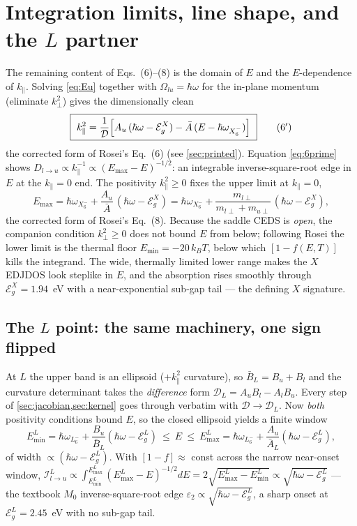 \documentclass[11pt]{article}
\newcommand{\kperp}{k_{\perp}}
\newcommand{\kpar}{k_{\parallel}}
\newcommand{\hw}{\hbar\omega}
\newcommand{\EgX}{\mathcal{E}_{g}^{X}}
\newcommand{\EgL}{\mathcal{E}_{g}^{L}}
\newcommand{\Dc}{\mathcal{D}}
\newcommand{\Dlu}{D_{l\to u}}
\newcommand{\Ic}{\mathcal{I}_{l\to u}}
\newcommand{\Ab}{\bar{A}}
\newcommand{\Bb}{\bar{B}}
\newcommand{\wXsix}{\hbar\omega_{X_6^-}}
\newcommand{\Rq}[1]{\textcolor{roseicol}{\textnormal{(#1)}}}
\begin{document}
\section{Integration limits, line shape, and the $L$ partner}
\label{sec:limits}

The remaining content of Eqs.~\Rq{6}--\Rq{8} is the domain of $E$ and the
$E$-dependence of $\kpar$. Solving \eqref{eq:Eu} together with $\Omega_{lu}=\hw$ for the
in-plane momentum (eliminate $\kperp^2$) gives the dimensionally clean
%
\begin{equation}
\boxed{\ \kpar^{2}=\frac{1}{\Dc}\Bigl[A_u\,(\hw-\EgX)-\Ab\,(E-\wXsix)\Bigr]\ }
\tag{6$'$}
\label{eq:6prime}
\end{equation}
%
the corrected form of Rosei's Eq.~\Rq{6} (see \cref{sec:printed}). Equation
\eqref{eq:6prime} shows $\Dlu\propto\kpar^{-1}\propto(E_{\max}-E)^{-1/2}$: an integrable
inverse-square-root edge in $E$ at the $\kpar=0$ end. The positivity $\kpar^2\ge0$ fixes
the upper limit at $\kpar=0$,
%
\begin{equation}
E_{\max}=\wXsix+\frac{A_u}{\Ab}\,(\hw-\EgX)
       =\wXsix+\frac{m_{l\perp}}{m_{l\perp}+m_{u\perp}}\,(\hw-\EgX),
\label{eq:Emax}
\end{equation}
%
the corrected form of Rosei's Eq.~\Rq{8}. Because the saddle CEDS is \emph{open}, the
companion condition $\kperp^2\ge0$ does not bound $E$ from below; following Rosei the
lower limit is the thermal floor $E_{\min}=-20\,k_BT$, below which $[1-f(E,T)]$ kills the
integrand. The wide, thermally limited lower range makes the $X$ EDJDOS look steplike in
$E$, and the absorption rises smoothly through $\EgX=1.94$~eV with a near-exponential
sub-gap tail --- the defining $X$ signature.

\subsection{The $L$ point: the same machinery, one sign flipped}

At $L$ the upper band is an ellipsoid ($+\kpar^2$ curvature), so $\Bb_L=B_u+B_l$ and the
curvature determinant takes the \emph{difference} form
$\Dc_L=A_uB_l-A_lB_u$. Every step of \cref{sec:jacobian,sec:kernel} goes through verbatim
with $\Dc\to\Dc_L$. Now \emph{both} positivity conditions bound $E$, so the closed
ellipsoid yields a finite window
%
\begin{equation}
E_{\min}^{L}=\hbar\omega_{L_6^-}+\frac{B_u}{\Bb_L}(\hw-\EgL)
\ \le\ E\ \le\
E_{\max}^{L}=\hbar\omega_{L_6^-}+\frac{A_u}{\Ab_L}(\hw-\EgL),
\end{equation}
%
of width $\propto(\hw-\EgL)$. With $[1-f]\approx$ const across the narrow near-onset
window, $\Ic^{L}\propto\int_{E_{\min}^L}^{E_{\max}^L}(E_{\max}^L-E)^{-1/2}dE
=2\sqrt{E_{\max}^L-E_{\min}^L}\propto\sqrt{\hw-\EgL}$ --- the textbook $M_0$ inverse-square-root
edge $\varepsilon_2\propto\sqrt{\hw-\EgL}$, a sharp onset at $\EgL=2.45$~eV with no
sub-gap tail.
\end{document}
